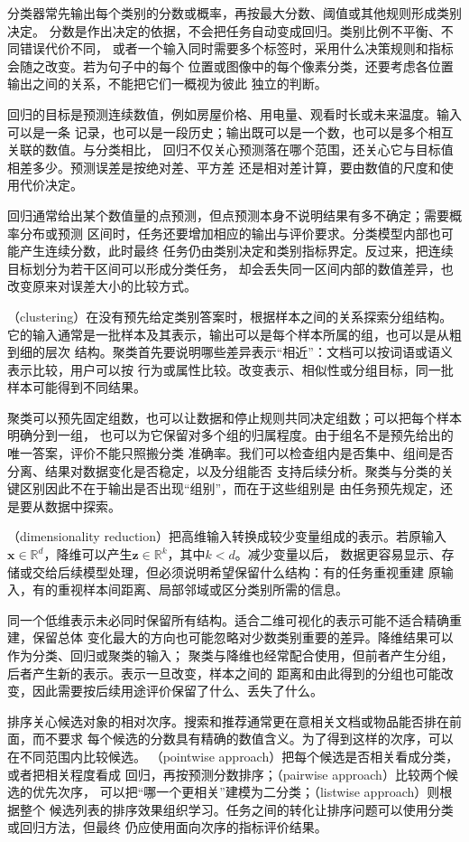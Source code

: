 分类器常先输出每个类别的分数或概率，再按最大分数、阈值或其他规则形成类别决定。
分数是作出决定的依据，不会把任务自动变成回归。类别比例不平衡、不同错误代价不同，
或者一个输入同时需要多个标签时，采用什么决策规则和指标会随之改变。若为句子中的每个
位置或图像中的每个像素分类，还要考虑各位置输出之间的关系，不能把它们一概视为彼此
独立的判断。

回归的目标是预测连续数值，例如房屋价格、用电量、观看时长或未来温度。输入可以是一条
记录，也可以是一段历史；输出既可以是一个数，也可以是多个相互关联的数值。与分类相比，
回归不仅关心预测落在哪个范围，还关心它与目标值相差多少。预测误差是按绝对差、平方差
还是相对差计算，要由数值的尺度和使用代价决定。

回归通常给出某个数值量的点预测，但点预测本身不说明结果有多不确定；需要概率分布或预测
区间时，任务还要增加相应的输出与评价要求。分类模型内部也可能产生连续分数，此时最终
任务仍由类别决定和类别指标界定。反过来，把连续目标划分为若干区间可以形成分类任务，
却会丢失同一区间内部的数值差异，也改变原来对误差大小的比较方式。

（clustering）在没有预先给定类别答案时，根据样本之间的关系探索分组结构。
它的输入通常是一批样本及其表示，输出可以是每个样本所属的组，也可以是从粗到细的层次
结构。聚类首先要说明哪些差异表示“相近”：文档可以按词语或语义表示比较，用户可以按
行为或属性比较。改变表示、相似性或分组目标，同一批样本可能得到不同结果。

聚类可以预先固定组数，也可以让数据和停止规则共同决定组数；可以把每个样本明确分到一组，
也可以为它保留对多个组的归属程度。由于组名不是预先给出的唯一答案，评价不能只照搬分类
准确率。我们可以检查组内是否集中、组间是否分离、结果对数据变化是否稳定，以及分组能否
支持后续分析。聚类与分类的关键区别因此不在于输出是否出现“组别”，而在于这些组别是
由任务预先规定，还是要从数据中探索。

（dimensionality reduction）把高维输入转换成较少变量组成的表示。若原输入
$\bm x\in\mathbb R^d$，降维可以产生$\bm z\in\mathbb R^k$，其中$k<d$。减少变量以后，
数据更容易显示、存储或交给后续模型处理，但必须说明希望保留什么结构：有的任务重视重建
原输入，有的重视样本间距离、局部邻域或区分类别所需的信息。

同一个低维表示未必同时保留所有结构。适合二维可视化的表示可能不适合精确重建，保留总体
变化最大的方向也可能忽略对少数类别重要的差异。降维结果可以作为分类、回归或聚类的输入；
聚类与降维也经常配合使用，但前者产生分组，后者产生新的表示。表示一旦改变，样本之间的
距离和由此得到的分组也可能改变，因此需要按后续用途评价保留了什么、丢失了什么。

排序关心候选对象的相对次序。搜索和推荐通常更在意相关文档或物品能否排在前面，而不要求
每个候选的分数具有精确的数值含义。为了得到这样的次序，可以在不同范围内比较候选。
（pointwise approach）把每个候选是否相关看成分类，或者把相关程度看成
回归，再按预测分数排序；（pairwise approach）比较两个候选的优先次序，
可以把“哪一个更相关”建模为二分类；（listwise approach）则根据整个
候选列表的排序效果组织学习。任务之间的转化让排序问题可以使用分类或回归方法，但最终
仍应使用面向次序的指标评价结果。

